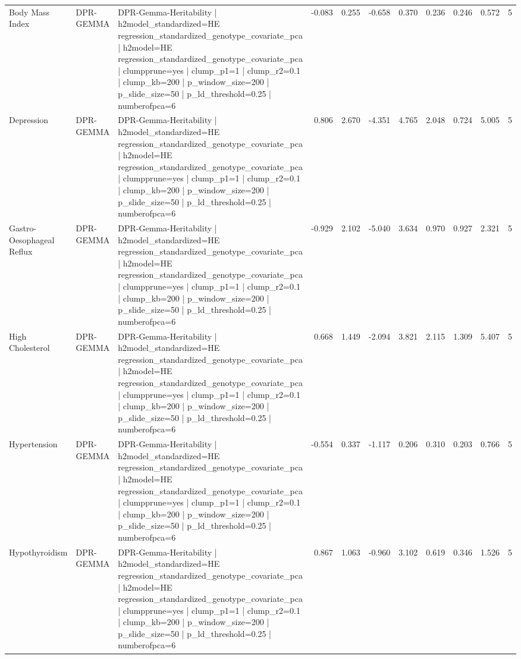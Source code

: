 \begin{landscape}
\begin{longtable}{p{2.4cm}p{1.8cm}p{6.0cm}rrrrrrrr}
Body Mass Index & DPR-GEMMA & DPR-Gemma-Heritability | h2model\_standardized=HE regression\_standardized\_genotype\_covariate\_pca | h2model=HE regression\_standardized\_genotype\_covariate\_pca | clumpprune=yes | clump\_p1=1 | clump\_r2=0.1 | clump\_kb=200 | p\_window\_size=200 | p\_slide\_size=50 | p\_ld\_threshold=0.25 | numberofpca=6 & -0.083 & 0.255 & -0.658 & 0.370 & 0.236 & 0.246 & 0.572 & 5 \\
Depression & DPR-GEMMA & DPR-Gemma-Heritability | h2model\_standardized=HE regression\_standardized\_genotype\_covariate\_pca | h2model=HE regression\_standardized\_genotype\_covariate\_pca | clumpprune=yes | clump\_p1=1 | clump\_r2=0.1 | clump\_kb=200 | p\_window\_size=200 | p\_slide\_size=50 | p\_ld\_threshold=0.25 | numberofpca=6 & 0.806 & 2.670 & -4.351 & 4.765 & 2.048 & 0.724 & 5.005 & 5 \\
Gastro-Oesophageal Reflux & DPR-GEMMA & DPR-Gemma-Heritability | h2model\_standardized=HE regression\_standardized\_genotype\_covariate\_pca | h2model=HE regression\_standardized\_genotype\_covariate\_pca | clumpprune=yes | clump\_p1=1 | clump\_r2=0.1 | clump\_kb=200 | p\_window\_size=200 | p\_slide\_size=50 | p\_ld\_threshold=0.25 | numberofpca=6 & -0.929 & 2.102 & -5.040 & 3.634 & 0.970 & 0.927 & 2.321 & 5 \\
High Cholesterol & DPR-GEMMA & DPR-Gemma-Heritability | h2model\_standardized=HE regression\_standardized\_genotype\_covariate\_pca | h2model=HE regression\_standardized\_genotype\_covariate\_pca | clumpprune=yes | clump\_p1=1 | clump\_r2=0.1 | clump\_kb=200 | p\_window\_size=200 | p\_slide\_size=50 | p\_ld\_threshold=0.25 | numberofpca=6 & 0.668 & 1.449 & -2.094 & 3.821 & 2.115 & 1.309 & 5.407 & 5 \\
Hypertension & DPR-GEMMA & DPR-Gemma-Heritability | h2model\_standardized=HE regression\_standardized\_genotype\_covariate\_pca | h2model=HE regression\_standardized\_genotype\_covariate\_pca | clumpprune=yes | clump\_p1=1 | clump\_r2=0.1 | clump\_kb=200 | p\_window\_size=200 | p\_slide\_size=50 | p\_ld\_threshold=0.25 | numberofpca=6 & -0.554 & 0.337 & -1.117 & 0.206 & 0.310 & 0.203 & 0.766 & 5 \\
Hypothyroidism & DPR-GEMMA & DPR-Gemma-Heritability | h2model\_standardized=HE regression\_standardized\_genotype\_covariate\_pca | h2model=HE regression\_standardized\_genotype\_covariate\_pca | clumpprune=yes | clump\_p1=1 | clump\_r2=0.1 | clump\_kb=200 | p\_window\_size=200 | p\_slide\_size=50 | p\_ld\_threshold=0.25 | numberofpca=6 & 0.867 & 1.063 & -0.960 & 3.102 & 0.619 & 0.346 & 1.526 & 5 \\

\end{longtable}
\end{landscape}
